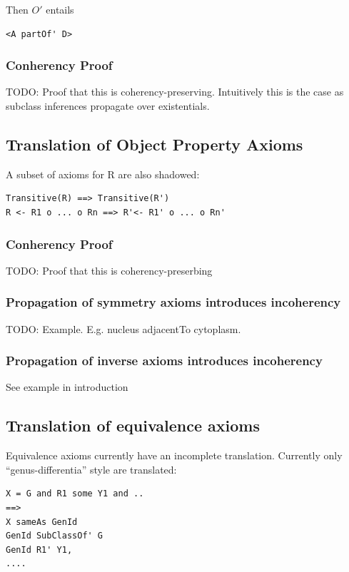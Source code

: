 \documentclass{my}
\begin{document}
Then $O'$ entails 

\begin{verbatim}
<A partOf' D>
\end{verbatim}

\subsubsection{Conherency Proof} TODO: Proof that this is
coherency-preserving. Intuitively this is the case as subclass
inferences propagate over existentials.

\subsection{Translation of Object Property Axioms}

A subset of axioms for R are also shadowed:

\begin{verbatim}
Transitive(R) ==> Transitive(R')
R <- R1 o ... o Rn ==> R'<- R1' o ... o Rn'
\end{verbatim}

\subsubsection{Conherency Proof} TODO: Proof that this is coherency-preserbing

\subsubsection{Propagation of symmetry axioms introduces incoherency}
TODO: Example. E.g. nucleus adjacentTo cytoplasm.

\subsubsection{Propagation of inverse axioms introduces incoherency}
See example in introduction

\subsection{Translation of equivalence axioms}

Equivalence axioms currently have an incomplete translation. Currently only ``genus-differentia'' style
are translated:



\begin{verbatim}
X = G and R1 some Y1 and ..
==>
X sameAs GenId
GenId SubClassOf' G
GenId R1' Y1,
....
\end{verbatim}
\end{document}
